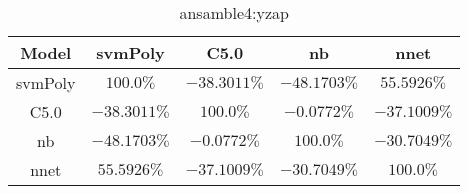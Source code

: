 \begin{table}[!ht]
	\centering
	\begin{tabular}{|c|c|c|c|c|}
		\hline
		Model & svmPoly & C5.0 & nb & nnet \\ \hline
		svmPoly & $100.0\%$ & $-38.3011\%$ & $-48.1703\%$ & $55.5926\%$ \\ \hline
		C5.0 & $-38.3011\%$ & $100.0\%$ & $-0.0772\%$ & $-37.1009\%$ \\ \hline
		nb & $-48.1703\%$ & $-0.0772\%$ & $100.0\%$ & $-30.7049\%$ \\ \hline
		nnet & $55.5926\%$ & $-37.1009\%$ & $-30.7049\%$ & $100.0\%$ \\ \hline
	\end{tabular}
	\caption{ansamble4:yzap}
	\label{tab:ansamble4:yzap}
\end{table}
